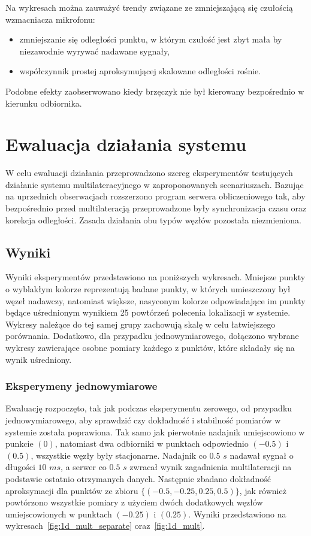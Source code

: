 Na wykresach można zauważyć trendy związane ze zmniejszającą się czułością wzmacniacza mikrofonu:

\begin{itemize}
    \item zmniejszanie się odległości punktu, w którym czułość jest zbyt mała by niezawodnie wyrywać nadawane sygnały,
    \item współczynnik prostej aproksymującej skalowane odległości rośnie.
\end{itemize}

Podobne efekty zaobserwowano kiedy brzęczyk nie był kierowany bezpośrednio w kierunku odbiornika.

\section{Ewaluacja działania systemu}

W celu ewaluacji działania przeprowadzono szereg eksperymentów testujących działanie systemu multilateracyjnego w zaproponowanych scenariuszach. Bazując na uprzednich obserwacjach rozszerzono program serwera obliczeniowego tak, aby bezpośrednio przed multilateracją przeprowadzone były synchronizacja czasu oraz korekcja odległości. Zasada działania obu typów węzłów pozostała niezmieniona.

\subsection{Wyniki}

Wyniki eksperymentów przedstawiono na  poniższych wykresach. Mniejsze punkty o wyblakłym kolorze reprezentują badane punkty, w których umieszczony był węzeł nadawczy, natomiast większe, nasyconym kolorze odpowiadające im punkty będące uśrednionym wynikiem 25 powtórzeń polecenia lokalizacji w systemie. Wykresy należące do tej samej grupy zachowują skalę w celu łatwiejszego porównania. Dodatkowo, dla przypadku jednowymiarowego, dołączono wybrane wykresy zawierające osobne pomiary każdego z punktów, które składały się na wynik uśredniony.

\subsubsection{Eksperymeny jednowymiarowe}

Ewaluację rozpoczęto, tak jak podczas eksperymentu zerowego, od przypadku jednowymiarowego, aby sprawdzić czy dokładność i stabilność pomiarów w systemie została poprawiona. Tak samo jak pierwotnie nadajnik umiejscowiono w punkcie $(0)$, natomiast dwa odbiorniki w punktach odpowiednio $(-0.5)$ i $(0.5)$, wszystkie węzły były stacjonarne. Nadajnik co $0.5$ $s$ nadawał sygnał o długości $10$ $ms$, a serwer co $0.5$ $s$ zwracał wynik zagadnienia multilateracji na podstawie ostatnio otrzymanych danych. Następnie zbadano dokładność aproksymacji dla punktów ze zbioru $\{(-0.5, -0.25, 0.25, 0.5)\}$, jak również powtórzono wszystkie pomiary z użyciem dwóch dodatkowych węzłów umiejscowionych w punktach $(-0.25)$ i $(0.25)$. Wyniki przedstawiono na wykresach~\ref{fig:1d_mult_separate} oraz~\ref{fig:1d_mult}.

